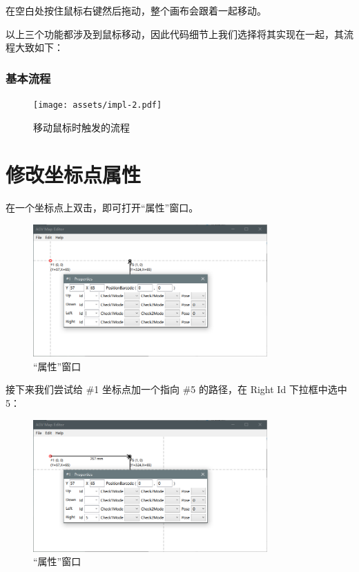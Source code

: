 在空白处按住鼠标右键然后拖动，整个画布会跟着一起移动。

以上三个功能都涉及到鼠标移动，因此代码细节上我们选择将其实现在一起，其流程大致如下：

\subsubsection{基本流程}

\begin{figure}[H]
    \centering
    \texttt{[image: assets/impl-2.pdf]}
    \caption{移动鼠标时触发的流程}
    \label{fig:impl-2}
\end{figure}

\section{修改坐标点属性}

在一个坐标点上双击，即可打开``属性''窗口。

\begin{figure}[H]
  \centering
  \includegraphics[width=0.8\textwidth]{assets/prop.png}
  \caption{``属性''窗口}
  \label{fig:prop}
\end{figure}

接下来我们尝试给 \#1 坐标点加一个指向 \#5 的路径，在 Right Id 下拉框中选中 5：

\begin{figure}[H]
  \centering
  \includegraphics[width=0.8\textwidth]{assets/prop2.png}
  \caption{``属性''窗口}
  \label{fig:prop2}
\end{figure}


